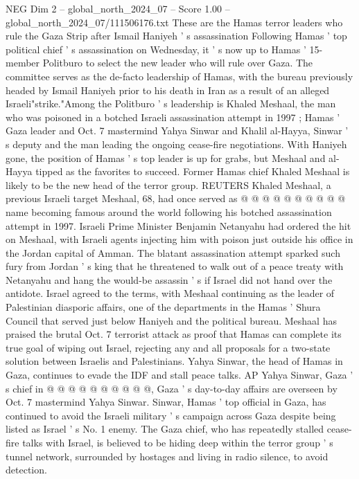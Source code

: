 \begin{textsample}{NEG Dim 2 – global\_north\_2024\_07 – Score 1.00 – global\_north\_2024\_07/111506176.txt}  \label{ex:f2_neg_066}
These are the Hamas terror leaders who rule the Gaza Strip after Ismail Haniyeh ' s assassination Following Hamas ' top political chief ' s assassination on Wednesday, it ' s now up to Hamas ' 15-member Politburo to select the new leader who will rule over Gaza.
The committee serves as the de-facto leadership of Hamas, with the bureau previously headed by Ismail Haniyeh prior to his death in Iran as a result of an alleged Israeli"strike."Among the Politburo ' s leadership is Khaled Meshaal, the man who was poisoned in a botched Israeli assassination attempt in 1997 ; Hamas ' Gaza leader and Oct. 7 mastermind Yahya Sinwar and Khalil al-Hayya, Sinwar ' s deputy and the man leading the ongoing cease-fire negotiations.
With Haniyeh gone, the position of Hamas ' s top leader is up for grabs, but Meshaal and al-Hayya tipped as the favorites to succeed.
Former Hamas chief Khaled Meshaal is likely to be the new head of the terror group.
REUTERS Khaled Meshaal, a previous Israeli target Meshaal, 68, had once served as @ @ @ @ @ @ @ @ @ @ name becoming famous around the world following his botched assassination attempt in 1997.
Israeli Prime Minister Benjamin Netanyahu had ordered the hit on Meshaal, with Israeli agents injecting him with poison just outside his office in the Jordan capital of Amman.
The blatant assassination attempt sparked such fury from Jordan ' s king that he threatened to walk out of a peace treaty with Netanyahu and hang the would-be assassin ' s if Israel did not hand over the antidote.
Israel agreed to the terms, with Meshaal continuing as the leader of Palestinian diasporic affairs, one of the departments in the Hamas ' Shura Council that served just below Haniyeh and the political bureau.
Meshaal has praised the brutal Oct. 7 terrorist attack as proof that Hamas can complete its true goal of wiping out Israel, rejecting any and all proposals for a two-state solution between Israelis and Palestinians.
Yahya Sinwar, the head of Hamas in Gaza, continues to evade the IDF and stall peace talks.
AP Yahya Sinwar, Gaza ' s chief in @ @ @ @ @ @ @ @ @ @, Gaza ' s day-to-day affairs are overseen by Oct. 7 mastermind Yahya Sinwar.
Sinwar, Hamas ' top official in Gaza, has continued to avoid the Israeli military ' s campaign across Gaza despite being listed as Israel ' s No. 1 enemy.
The Gaza chief, who has repeatedly stalled cease-fire talks with Israel, is believed to be hiding deep within the terror group ' s tunnel network, surrounded by hostages and living in radio silence, to avoid detection.

\end{textsample}
